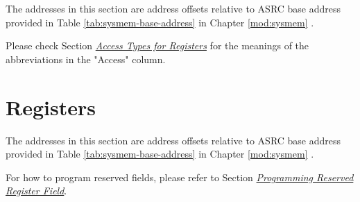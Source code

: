 \documentclass[main\_\_EN.tex]{subfiles}
\begin{document}
The addresses in this section are address offsets relative to ASRC base address provided in Table \ref{tab:sysmem-base-address} in Chapter \ref{mod:sysmem} \textit{}.

Please check Section \hyperref[glossary-access-types]{\textit{Access Types for Registers}} for the meanings of the abbreviations in the "Access" column.





\newpage
\section{Registers}

The addresses in this section are address offsets relative to ASRC base address provided in Table \ref{tab:sysmem-base-address} in Chapter \ref{mod:sysmem} \textit{}.

For how to program reserved fields, please refer to Section \hyperref[programming-reserved-field]{\textit{Programming Reserved Register Field}}.


\end{document}
